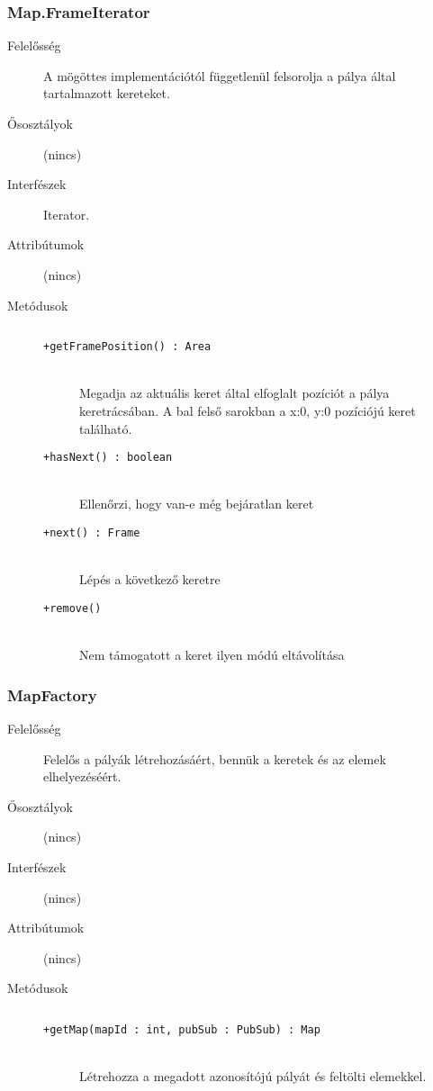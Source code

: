 		\subsubsection{Map.FrameIterator}
			\begin{description}

				\item[Felelősség] A mögöttes implementációtól függetlenül felsorolja a pálya által tartalmazott kereteket.

				\item[Ősosztályok] (nincs)
				\item[Interfészek] Iterator.
				\item[Attribútumok] (nincs)
				\item[Metódusok]$\ $
					\begin{description}
						\item[\texttt{+getFramePosition() : Area}] \hfill \\Megadja az aktuális keret által elfoglalt  pozíciót a pálya keretrácsában.    A bal felső sarokban a x:0, y:0  pozíciójú keret található. 
						\item[\texttt{+hasNext() : boolean}] \hfill \\Ellenőrzi, hogy van-e még bejáratlan keret 
						\item[\texttt{+next() : Frame}] \hfill \\Lépés a következő keretre 
						\item[\texttt{+remove()}] \hfill \\Nem támogatott a keret ilyen módú eltávolítása 
					\end{description}
			\end{description}

		\subsubsection{MapFactory}
			\begin{description}

				\item[Felelősség] Felelős a pályák létrehozásáért, bennük a keretek és az elemek elhelyezéséért.

				\item[Ősosztályok] (nincs)
				\item[Interfészek] (nincs)
				\item[Attribútumok] (nincs)
				\item[Metódusok]$\ $
					\begin{description}
						\item[\texttt{+getMap(mapId : int, pubSub : PubSub) : Map}] \hfill \\Létrehozza a megadott azonosítójú pályát  és feltölti elemekkel. 
					\end{description}
			\end{description}

